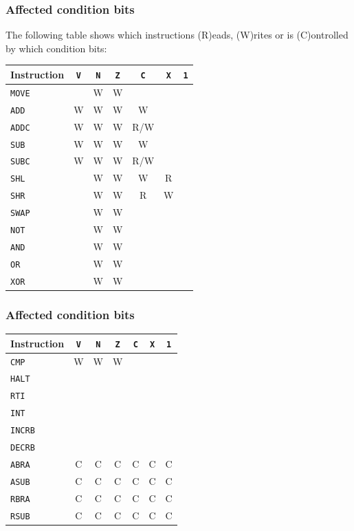 \documentclass{beamer}
\begin{document}
   \begin{frame}
    \frametitle{Affected condition bits}
    The following table shows which instructions (R)eads, (W)rites or is 
    (C)ontrolled by which condition bits:
    \begin{center}
     \begin{tabular}{|l|c|c|c|c|c|c|}
      \hline
       Instruction&\texttt{V}&\texttt{N}&\texttt{Z}&\texttt{C}&\texttt{X}&\texttt{1}\\
      \hline
       \texttt{MOVE} & &W&W& & & \\
       \texttt{ADD}  &W&W&W&W& & \\
       \texttt{ADDC} &W&W&W&R/W& & \\
       \texttt{SUB}  &W&W&W&W& & \\
       \texttt{SUBC} &W&W&W&R/W& & \\
       \texttt{SHL}  & &W&W&W&R& \\
       \texttt{SHR}  & &W&W&R&W& \\
       \texttt{SWAP} & &W&W& & & \\
       \texttt{NOT}  & &W&W& & & \\
       \texttt{AND}  & &W&W& & & \\
       \texttt{OR}   & &W&W& & & \\
       \texttt{XOR}  & &W&W& & & \\
      \hline
     \end{tabular}
    \end{center}
   \end{frame}
%
   \begin{frame}
    \frametitle{Affected condition bits}
    \begin{center}
     \begin{tabular}{|l|c|c|c|c|c|c|}
      \hline
       Instruction&\texttt{V}&\texttt{N}&\texttt{Z}&\texttt{C}&\texttt{X}&\texttt{1}\\
      \hline
       \texttt{CMP}  &W&W&W& & & \\
       \texttt{HALT} & & & & & & \\
       \texttt{RTI}  & & & & & & \\
       \texttt{INT}  & & & & & & \\
       \texttt{INCRB}& & & & & & \\
       \texttt{DECRB}& & & & & & \\
       \texttt{ABRA} &C&C&C&C&C&C\\
       \texttt{ASUB} &C&C&C&C&C&C\\
       \texttt{RBRA} &C&C&C&C&C&C\\
       \texttt{RSUB} &C&C&C&C&C&C\\
      \hline
     \end{tabular}
    \end{center}
   \end{frame}
\end{document}
